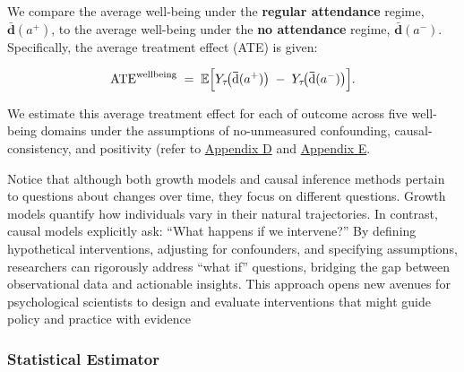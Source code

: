 \documentclass[
  single column]{article}
\begin{document}
We compare the average well-being under the \textbf{regular attendance}
regime, \(\boldsymbol{\bar{\boldsymbol{\text{d}}}}(a^+)\), to the
average well-being under the \textbf{no attendance} regime,
\(\boldsymbol{\bar{\boldsymbol{\text{d}}}}(a^-)\). Specifically, the
average treatment effect (ATE) is given:

\[
\text{ATE}^{\text{wellbeing}} 
\;=\; 
\mathbb{E}
\Bigl[
  Y_\tau\!\bigl(\boldsymbol{\bar{\boldsymbol{\text{d}}}}(a^+)\bigr) 
  \;-\; 
  Y_\tau\!\bigl(\boldsymbol{\bar{\boldsymbol{\text{d}}}}(a^-)\bigr)
\Bigr].
\]

We estimate this average treatment effect for each of outcome across
five well-being domains under the assumptions of no-unmeasured
confounding, causal-consistency, and positivity (refer to
\hyperref[appendix-assumptions]{Appendix D} and
\hyperref[appendix-positivity]{Appendix E}.

Notice that although both growth models and causal inference methods
pertain to questions about changes over time, they focus on different
questions. Growth models quantify how individuals vary in their natural
trajectories. In contrast, causal models explicitly ask: ``What happens
if we intervene?'' By defining hypothetical interventions, adjusting for
confounders, and specifying assumptions, researchers can rigorously
address ``what if'' questions, bridging the gap between observational
data and actionable insights. This approach opens new avenues for
psychological scientists to design and evaluate interventions that might
guide policy and practice with evidence

\subsubsection{Statistical Estimator}\label{statistical-estimator}
\end{document}
